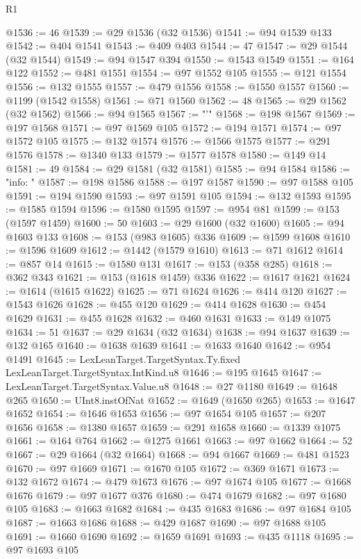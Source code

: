 \begin{lexlean}{R1}
\begin{coremodule}
{{{{{{{{{{{{{{{{{{{{{{{{{{{{{{{{{{{{{{{{{{{{{{{{{{{{{{{{{{{{{{{{{{{{{{{{{{{{{{{{{{{{{{{{{{{{{{{{{{{{{{{{{{{{{{{{{{{{{{{{{{{{{{{{{{{{{{{{{{{{{{{{{{{{{{{{{{{{{{{{{{{{{{{{{{{{{{{{{{{{{{{{{{@1536 := 46
@1539 := @29 @1536 (@32 @1536)
@1541 := @94 @1539 @133
@1542 := @404 @1541
@1543 := @409 @403
@1544 := 47
@1547 := @29 @1544 (@32 @1544)
@1549 := @94 @1547 @394
@1550 := @1543 @1549
@1551 := @164 @122
@1552 := @481 @1551
@1554 := @97 @1552 @105
@1555 := @121 @1554
@1556 := @132 @1555
@1557 := @479 @1556
@1558 := @1550 @1557
@1560 := @1199 (@1542 @1558)
@1561 := @71 @1560
@1562 := 48
@1565 := @29 @1562 (@32 @1562)
@1566 := @94 @1565
@1567 := "'"
@1568 := @198 @1567
@1569 := @197 @1568
@1571 := @97 @1569 @105
@1572 := @194 @1571
@1574 := @97 @1572 @105
@1575 := @132 @1574
@1576 := @1566 @1575
@1577 := @291 @1576
@1578 := @1340 @133
@1579 := @1577 @1578
@1580 := @149 @14
@1581 := 49
@1584 := @29 @1581 (@32 @1581)
@1585 := @94 @1584
@1586 := "info: "
@1587 := @198 @1586
@1588 := @197 @1587
@1590 := @97 @1588 @105
@1591 := @194 @1590
@1593 := @97 @1591 @105
@1594 := @132 @1593
@1595 := @1585 @1594
@1596 := @1580 @1595
@1597 := @954 @81
@1599 := @153 (@1597 @1459)
@1600 := 50
@1603 := @29 @1600 (@32 @1600)
@1605 := @94 @1603 @133
@1608 := @153 (@983 @1605) @336
@1609 := @1599 @1608
@1610 := @1596 @1609
@1612 := @1442 (@1579 @1610)
@1613 := @71 @1612
@1614 := @857 @14
@1615 := @1580 @131
@1617 := @153 (@358 @285)
@1618 := @362 @343
@1621 := @153 (@1618 @1459) @336
@1622 := @1617 @1621
@1624 := @1614 (@1615 @1622)
@1625 := @71 @1624
@1626 := @414 @120
@1627 := @1543 @1626
@1628 := @455 @120
@1629 := @414 @1628
@1630 := @454 @1629
@1631 := @455 @1628
@1632 := @460 @1631
@1633 := @149 @1075
@1634 := 51
@1637 := @29 @1634 (@32 @1634)
@1638 := @94 @1637
@1639 := @132 @165
@1640 := @1638 @1639
@1641 := @1633 @1640
@1642 := @954 @1491
@1645 := LexLeanTarget.TargetSyntax.Ty.fixed LexLeanTarget.TargetSyntax.IntKind.u8
@1646 := @195 @1645
@1647 := LexLeanTarget.TargetSyntax.Value.u8
@1648 := @27 @1180
@1649 := @1648 @265
@1650 := UInt8.instOfNat
@1652 := @1649 (@1650 @265)
@1653 := @1647 @1652
@1654 := @1646 @1653
@1656 := @97 @1654 @105
@1657 := @207 @1656
@1658 := @1380 @1657
@1659 := @291 @1658
@1660 := @1339 @1075
@1661 := @164 @764
@1662 := @1275 @1661
@1663 := @97 @1662
@1664 := 52
@1667 := @29 @1664 (@32 @1664)
@1668 := @94 @1667
@1669 := @481 @1523
@1670 := @97 @1669
@1671 := @1670 @105
@1672 := @369 @1671
@1673 := @132 @1672
@1674 := @479 @1673
@1676 := @97 @1674 @105
@1677 := @1668 @1676
@1679 := @97 @1677 @376
@1680 := @474 @1679
@1682 := @97 @1680 @105
@1683 := @1663 @1682
@1684 := @435 @1683
@1686 := @97 @1684 @105
@1687 := @1663 @1686
@1688 := @429 @1687
@1690 := @97 @1688 @105
@1691 := @1660 @1690
@1692 := @1659 @1691
@1693 := @435 @1118
@1695 := @97 @1693 @105
}}}}}}}}}}}}}}}}}}}}}}}}}}}}}}}}}}}}}}}}}}}}}}}}}}}}}}}}}}}}}}}}}}}}}}}}}}}}}}}}}}}}}}}}}}}}}}}}}}}}}}}}}}}}}}}}}}}}}}}}}}}}}}}}}}}}}}}}}}}}}}}}}}}}}}}}}}}}}}}}}}}}}}}}}}}}}}}}}}}}}}}}}}
\end{coremodule}
\end{lexlean}
